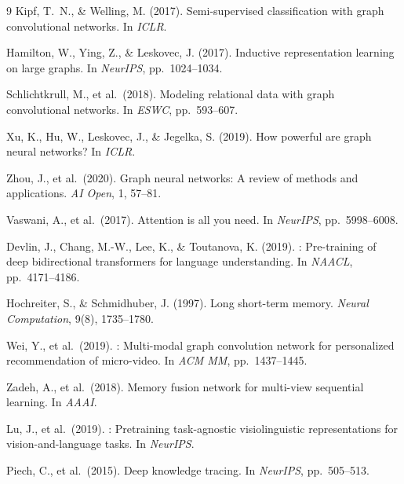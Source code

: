 \documentclass[sigconf]{acmart}
\begin{document}
\begin{thebibliography}{9}
Kipf, T.~N., \& Welling, M. (2017).
\newblock Semi-supervised classification with graph
  convolutional networks.
\newblock In \emph{ICLR}.

Hamilton, W., Ying, Z., \& Leskovec, J. (2017).
\newblock Inductive representation learning on large
  graphs.
\newblock In \emph{NeurIPS}, pp.\ 1024--1034.

Schlichtkrull, M., et al.\ (2018).
\newblock Modeling relational data with graph
  convolutional networks.
\newblock In \emph{ESWC}, pp.\ 593--607.

Xu, K., Hu, W., Leskovec, J., \& Jegelka, S. (2019).
\newblock How powerful are graph neural networks?
\newblock In \emph{ICLR}.

Zhou, J., et al.\ (2020).
\newblock Graph neural networks: A review of methods
  and applications.
\newblock \emph{AI Open}, 1, 57--81.

Vaswani, A., et al.\ (2017).
\newblock Attention is all you need.
\newblock In \emph{NeurIPS}, pp.\ 5998--6008.

Devlin, J., Chang, M.-W., Lee, K., \& Toutanova, K.
  (2019).
: Pre-training of deep bidirectional
  transformers for language understanding.
\newblock In \emph{NAACL}, pp.\ 4171--4186.

Hochreiter, S., \& Schmidhuber, J. (1997).
\newblock Long short-term memory.
\newblock \emph{Neural Computation}, 9(8), 1735--1780.

Wei, Y., et al.\ (2019).
: Multi-modal graph convolution
  network for personalized recommendation of
  micro-video.
\newblock In \emph{ACM MM}, pp.\ 1437--1445.

Zadeh, A., et al.\ (2018).
\newblock Memory fusion network for multi-view
  sequential learning.
\newblock In \emph{AAAI}.

Lu, J., et al.\ (2019).
: Pretraining task-agnostic
  visiolinguistic representations for
  vision-and-language tasks.
\newblock In \emph{NeurIPS}.

Piech, C., et al.\ (2015).
\newblock Deep knowledge tracing.
\newblock In \emph{NeurIPS}, pp.\ 505--513.


\end{thebibliography}
\end{document}
